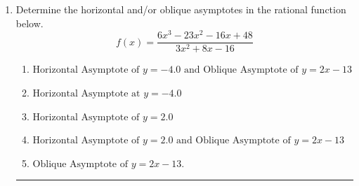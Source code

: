 \documentclass[14pt]{extbook}
\newcommand{\litem}[1]{\item#1\hspace*{-1cm}\rule{\textwidth}{0.4pt}}
\begin{document}
\begin{enumerate}
{\begin{enumerate}[label=\Alph*.]
\end{enumerate} }
\litem{
Determine the horizontal and/or oblique asymptotes in the rational function below.\[ f(x) = \frac{6x^{3} -23 x^{2} -16 x + 48}{3x^{2} +8 x -16} \]\begin{enumerate}[label=\Alph*.]
\item \( \text{Horizontal Asymptote of } y = -4.0 \text{ and Oblique Asymptote of } y = 2x -13 \)
\item \( \text{Horizontal Asymptote at } y = -4.0 \)
\item \( \text{Horizontal Asymptote of } y = 2.0  \)
\item \( \text{Horizontal Asymptote of } y = 2.0 \text{ and Oblique Asymptote of } y = 2x -13 \)
\item \( \text{Oblique Asymptote of } y = 2x -13. \)

\end{enumerate} }
\end{enumerate}
\end{document}
